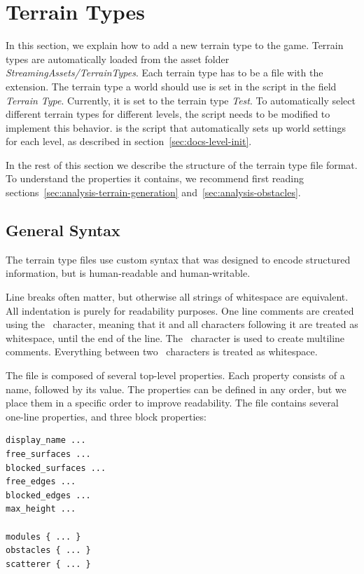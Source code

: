 \section{Terrain Types}\label{sec:docs-terrain-type}

In this section, we explain how to add a new terrain type to the game.
Terrain types are automatically loaded from the asset folder \emph{StreamingAssets/TerrainTypes}.
Each terrain type has to be a file with the  extension.
The terrain type a world should use is set in the  script in the field \emph{Terrain Type}.
Currently, it is set to the terrain type \emph{Test}.
To automatically select different terrain types for different levels, the  script needs to be modified to implement this behavior.
 is the script that automatically sets up world settings for each level, as described in section~\ref{sec:docs-level-init}.

In the rest of this section we describe the structure of the terrain type file format.
To understand the properties it contains, we recommend first reading sections~\ref{sec:analysis-terrain-generation} and~\ref{sec:analysis-obstacles}.

\subsection{General Syntax}

The terrain type files use custom syntax that was designed to encode structured information, but is human-readable and human-writable.

Line breaks often matter, but otherwise all strings of whitespace are equivalent.
All indentation is purely for readability purposes.
One line comments are created using the \mono{\#}~character, meaning that it and all characters following it are treated as whitespace, until the end of the line.
The \mono{\%}~character is used to create multiline comments.
Everything between two \mono{\%}~characters is treated as whitespace.

The file is composed of several top-level properties.
Each property consists of a name, followed by its value.
The properties can be defined in any order, but we place them in a specific order to improve readability.
The file contains several one-line properties, and three block properties:
\begin{verbatim}
display_name ...
free_surfaces ...
blocked_surfaces ...
free_edges ...
blocked_edges ...
max_height ...

modules { ... }
obstacles { ... }
scatterer { ... }
\end{verbatim}


